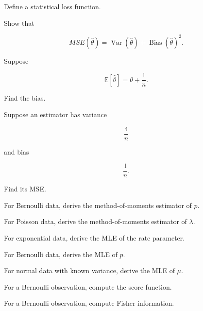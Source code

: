 \begin{exercise}[1]
Define a statistical loss function.
\end{exercise}

\begin{exercise}[2]
Show that

\[
MSE(\widehat{\theta})
=
\operatorname{Var}(\widehat{\theta})
+
\operatorname{Bias}(\widehat{\theta})^2.
\]
\end{exercise}

\begin{exercise}[2]
Suppose

\[
\mathbb{E}[\widehat{\theta}]
=
\theta+\frac1n.
\]

Find the bias.
\end{exercise}

\begin{exercise}[2]
Suppose an estimator has variance

\[
\frac4n
\]

and bias

\[
\frac1n.
\]

Find its MSE.
\end{exercise}

\begin{exercise}[2]
For Bernoulli data, derive the method-of-moments estimator of \(p\).
\end{exercise}

\begin{exercise}[2]
For Poisson data, derive the method-of-moments estimator of \(\lambda\).
\end{exercise}

\begin{exercise}[2]
For exponential data, derive the MLE of the rate parameter.
\end{exercise}

\begin{exercise}[2]
For Bernoulli data, derive the MLE of \(p\).
\end{exercise}

\begin{exercise}[2]
For normal data with known variance, derive the MLE of \(\mu\).
\end{exercise}

\begin{exercise}[2]
For a Bernoulli observation, compute the score function.
\end{exercise}

\begin{exercise}[2]
For a Bernoulli observation, compute Fisher information.
\end{exercise}

